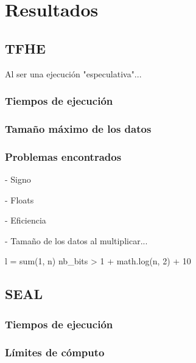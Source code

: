 \chapter{Resultados}
\label{chap:resultados}


\section{TFHE}

Al ser una ejecución "especulativa"...

\subsection{Tiempos de ejecución}

\subsection{Tamaño máximo de los datos}




\subsection{Problemas encontrados}

- Signo

- Floats

- Eficiencia


- Tamaño de los datos al multiplicar...

l = sum(1, n)
nb_bits > 1 + math.log(n, 2) + 10

\section{SEAL}

\subsection{Tiempos de ejecución}

\subsection{Límites de cómputo}

